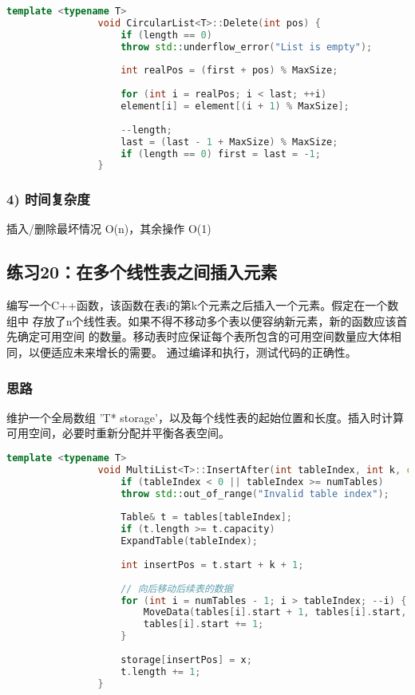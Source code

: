 \documentclass[UTF8]{ctexart}
\begin{document}
			\begin{lstlisting}[language=C++]
				template <typename T>
				void CircularList<T>::Delete(int pos) {
					if (length == 0)
					throw std::underflow_error("List is empty");
					
					int realPos = (first + pos) % MaxSize;
					
					for (int i = realPos; i < last; ++i)
					element[i] = element[(i + 1) % MaxSize];
					
					--length;
					last = (last - 1 + MaxSize) % MaxSize;
					if (length == 0) first = last = -1;
				}
			\end{lstlisting}
			\subsubsection{4) 时间复杂度}
			插入/删除最坏情况 O(n)，其余操作 O(1)
			\subsection{练习20：在多个线性表之间插入元素}
			编写一个C++函数，该函数在表i的第k个元素之后插入一个元素。假定在一个数组中
			存放了n个线性表。如果不得不移动多个表以便容纳新元素，新的函数应该首先确定可用空间
			的数量。移动表时应保证每个表所包含的可用空间数量应大体相同，以便适应未来增长的需要。
			通过编译和执行，测试代码的正确性。
			
			\subsubsection{思路}
			维护一个全局数组 'T* storage'，以及每个线性表的起始位置和长度。插入时计算可用空间，必要时重新分配并平衡各表空间。
			\begin{lstlisting}[language=C++]
				template <typename T>
				void MultiList<T>::InsertAfter(int tableIndex, int k, const T& x) {
					if (tableIndex < 0 || tableIndex >= numTables)
					throw std::out_of_range("Invalid table index");
					
					Table& t = tables[tableIndex];
					if (t.length >= t.capacity)
					ExpandTable(tableIndex);
					
					int insertPos = t.start + k + 1;
					
					// 向后移动后续表的数据
					for (int i = numTables - 1; i > tableIndex; --i) {
						MoveData(tables[i].start + 1, tables[i].start, tables[i].length);
						tables[i].start += 1;
					}
					
					storage[insertPos] = x;
					t.length += 1;
				}
			\end{lstlisting}
\end{document}
